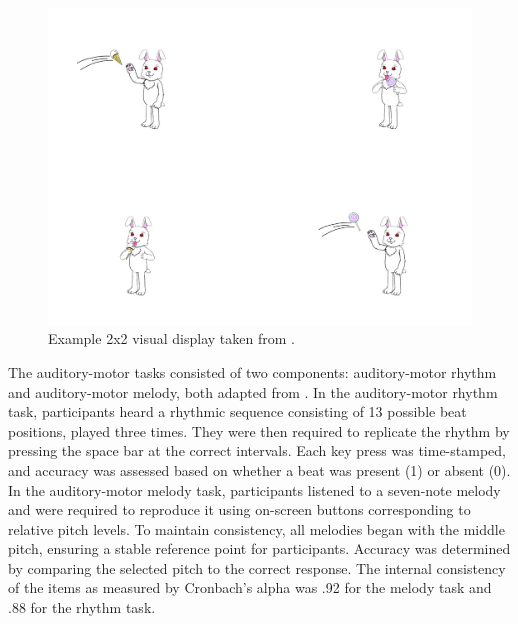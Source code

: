 \begin{figure}
    \centering
    \includegraphics[width=\textwidth,height=\textheight,keepaspectratio]{viz/Fig1-Geetal.jpg}
    \caption{Example 2x2 visual display taken from \cite{ge2021a}.}
    \label{fig:sampleslide}
\end{figure}


The auditory-motor tasks consisted of two components: auditory-motor rhythm and auditory-motor melody, both adapted from \parencite{Kachlicka_Saito_Tierney_2019}. In the auditory-motor rhythm task, participants heard a rhythmic sequence consisting of 13 possible beat positions, played three times. They were then required to replicate the rhythm by pressing the space bar at the correct intervals. Each key press was time-stamped, and accuracy was assessed based on whether a beat was present (1) or absent (0). In the auditory-motor melody task, participants listened to a seven-note melody and were required to reproduce it using on-screen buttons corresponding to relative pitch levels. To maintain consistency, all melodies began with the middle pitch, ensuring a stable reference point for participants. Accuracy was determined by comparing the selected pitch to the correct response. The internal consistency of the items as measured by Cronbach's alpha was .92 for the melody task and .88 for the rhythm task.

